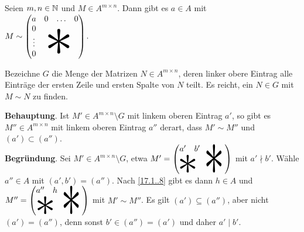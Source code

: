 \documentclass[../../main.tex]{subfiles}
\begin{document}
\begin{lem}\label{17.1.9}
Seien $m,n\in \mathbb N$ und $M\in A^{m\times n}$. Dann gibt es $a\in A$ mit\\ $M\sim\begin{pmatrix}a&0&\hdots&0\\
0&&&\\\vdots&&
\begin{tikzpicture}[overlay]\node[xshift=-0.3em,yshift=0.5em,scale=7]{$*$};\end{tikzpicture}&\\
0&&&
\end{pmatrix}$.
\end{lem}
\begin{cproof}
Bezeichne $G$ die Menge der Matrizen $N\in A^{m\times n}$, deren linker obere Eintrag alle Einträge der ersten Zeile und ersten Spalte von $N$ teilt. Es reicht, ein $N\in G$ mit $M\sim N$ zu finden.\\

\begin{tcolorbox}[arc=0mm, boxrule=0.2mm]\noindent\textbf{Behauptung}. Ist $M'\in A^{m\times n}\setminus G$ mit linkem oberen Eintrag $a'$, so gibt es $M''\in A^{m\times n}$ mit linkem oberen Eintrag $a''$ derart, dass $M'\sim M''$ und $(a')\subset (a'')$.\\

\noindent\textbf{Begründung}. Sei $M'\in A^{m\times n}\setminus G$, etwa $M'=\begin{pmatrix}a'&b'&&\begin{tikzpicture}[overlay]\node[xshift=-0.3em,yshift=-1em,yscale=8,xscale=5]{$*$};\end{tikzpicture}&\\&&&&\\\begin{tikzpicture}[overlay]\node[xshift=0.6em,yshift=0.8em,scale=5]{$*$};\end{tikzpicture}&&&\end{pmatrix}$ mit $a'\nmid b'$. Wähle $a''\in A$ mit $(a',b')=(a'')$. Nach \ref{17.1..8} gibt es dann $h\in A$ und $M''=\begin{pmatrix}a''&h&&\begin{tikzpicture}[overlay]\node[xshift=-0.3em,yshift=-1em,yscale=8,xscale=5]{$*$};\end{tikzpicture}&\\&&&&\\\begin{tikzpicture}[overlay]\node[xshift=0.6em,yshift=0.8em,scale=5]{$*$};\end{tikzpicture}&&&\end{pmatrix}$ mit $M'\sim M''$. Es gilt $(a')\subseteq (a'')$, aber nicht $(a')=(a'')$, denn sonst $b'\in(a'')=(a')$ und daher $a'\mid b'$.\end{tcolorbox}


\end{cproof}
\end{document}
